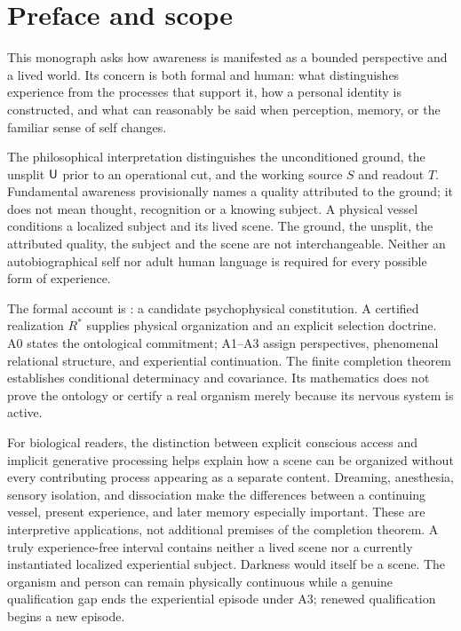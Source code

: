 \hypersetup{pageanchor=true}
\chapter*{Preface and scope}\label{chapter:preface-and-scope}
\small
This monograph asks how awareness is manifested as a bounded perspective and a lived world. Its concern is both formal and human: what distinguishes experience from the processes that support it, how a personal identity is constructed, and what can reasonably be said when perception, memory, or the familiar sense of self changes.

The philosophical interpretation distinguishes the unconditioned ground, the unsplit $\mathsf{U}$ prior to an operational cut, and the working source $S$ and readout $T$. Fundamental awareness provisionally names a quality attributed to the ground; it does not mean thought, recognition or a knowing subject. A physical vessel conditions a localized subject and its lived scene. The ground, the unsplit, the attributed quality, the subject and the scene are not interchangeable. Neither an autobiographical self nor adult human language is required for every possible form of experience.

The formal account is \spctwo: a candidate psychophysical constitution. A certified realization $R^\ast$ supplies physical organization and an explicit selection doctrine. A0 states the ontological commitment; A1--A3 assign perspectives, phenomenal relational structure, and experiential continuation. The finite completion theorem establishes conditional determinacy and covariance. Its mathematics does not prove the ontology or certify a real organism merely because its nervous system is active.

For biological readers, the distinction between explicit conscious access and implicit generative processing helps explain how a scene can be organized without every contributing process appearing as a separate content. Dreaming, anesthesia, sensory isolation, and dissociation make the differences between a continuing vessel, present experience, and later memory especially important. These are interpretive applications, not additional premises of the completion theorem. A truly experience-free interval contains neither a lived scene nor a currently instantiated localized experiential subject. Darkness would itself be a scene. The organism and person can remain physically continuous while a genuine qualification gap ends the experiential episode under A3; renewed qualification begins a new episode.

